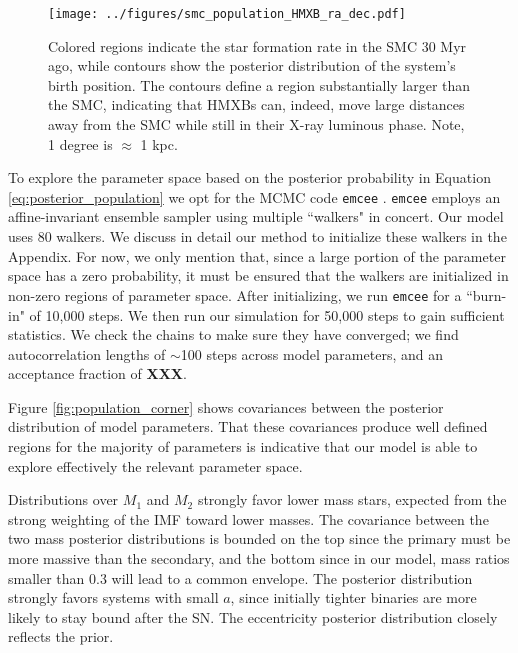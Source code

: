 \documentclass[12pt, preprint]{aastex}
\begin{document}
\begin{figure}[h!]
\begin{center}
\texttt{[image: ../figures/smc\_population\_HMXB\_ra\_dec.pdf]}
\caption{ Colored regions indicate the star formation rate in the SMC 30 Myr ago, while contours show the posterior distribution of the system's birth position. The contours define a region substantially larger than the SMC, indicating that HMXBs can, indeed, move large distances away from the SMC while still in their X-ray luminous phase. Note, 1 degree is $\approx$ 1 kpc.}
\label{fig:population_ra_dec}
\end{center}
\end{figure}



To explore the parameter space based on the posterior probability in Equation \ref{eq:posterior_population} we opt for the MCMC code {\tt emcee} \citep{foreman-mackey13}. {\tt emcee} employs an affine-invariant ensemble sampler using multiple ``walkers" in concert\citep{goodman10}. Our model uses 80 walkers. We discuss in detail our method to initialize these walkers in the Appendix. For now, we only mention that, since a large portion of the parameter space has a zero probability, it must be ensured that the walkers are initialized in non-zero regions of parameter space. After initializing, we run {\tt emcee} for a ``burn-in" of 10,000 steps. We then run our simulation for 50,000 steps to gain sufficient statistics. We check the chains to make sure they have converged; we find autocorrelation lengths of $\sim$100 steps across model parameters, and an acceptance fraction of {\bf XXX}. 

Figure \ref{fig:population_corner} shows covariances between the posterior distribution of model parameters. That these covariances produce well defined regions for the majority of parameters is indicative that our model is able to explore effectively the relevant parameter space. 

Distributions over $M_1$ and $M_2$ strongly favor lower mass stars, expected from the strong weighting of the IMF toward lower masses. The covariance between the two mass posterior distributions is bounded on the top since the primary must be more massive than the secondary, and the bottom since in our model, mass ratios smaller than 0.3 will lead to a common envelope. The posterior distribution strongly favors systems with small $a$, since initially tighter binaries are more likely to stay bound after the SN. The eccentricity posterior distribution closely reflects the prior. 
\end{document}
